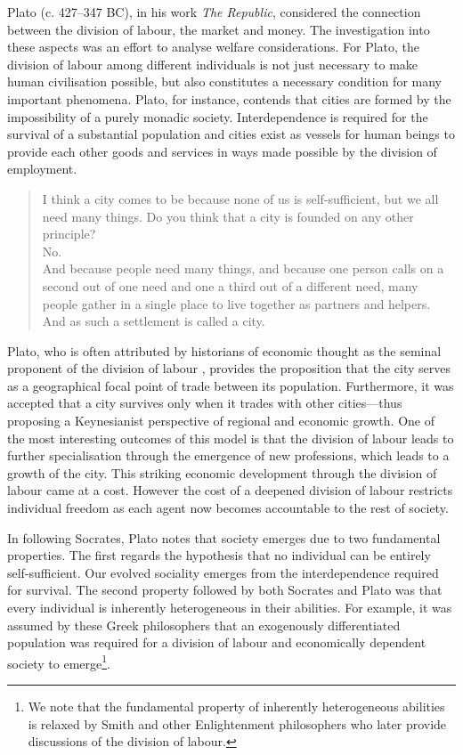 Plato (c. 427--347 BC), in his work \textit{The Republic}, considered the connection between the division of labour, the market and money. The investigation into these aspects was an effort to analyse welfare considerations. For Plato, the division of labour among different individuals is not just necessary to make human civilisation possible, but also constitutes a necessary condition for many important phenomena. Plato, for instance, contends that cities are formed by the impossibility of a purely monadic society. Interdependence is required for the survival of a substantial population and cities exist as vessels for human beings to provide each other goods and services in ways made possible by the division of employment.

\begin{quote}
I think a city comes to be because none of us is self-sufficient, but we all need many things. Do you think that a city is founded on any other principle?
\\
No.
\\
And because people need many things, and because one person calls on a second out of one need and one a third out of a different need, many people gather in a single place to live together as partners and helpers. And as such a settlement is called a city.

\begin{flushright}
\citet[p.~151]{Plato2007}
\end{flushright}
\end{quote}

Plato, who is often attributed by historians of economic thought as the seminal proponent of the division of labour \citep{Silvermintz2010}, provides the proposition that the city serves as a geographical focal point of trade between its population. Furthermore, it was accepted that a city survives only when it trades with other cities---thus proposing a Keynesianist perspective of regional and economic growth. One of the most interesting outcomes of this model is that the division of labour leads to further specialisation through the emergence of new professions, which leads to a growth of the city. This striking economic development through the division of labour came at a cost. However the cost of a deepened division of labour restricts individual freedom as each agent now becomes accountable to the rest of society.

In following Socrates, Plato notes that society emerges due to two fundamental properties. The first regards the hypothesis that no individual can be entirely self-sufficient. Our evolved sociality emerges from the interdependence required for survival. The second property followed by both Socrates and Plato was that every individual is inherently heterogeneous in their abilities. For example, it was assumed by these Greek philosophers that an exogenously differentiated population was required for a division of labour and economically dependent society to emerge\footnote{We note that the fundamental property of inherently heterogeneous abilities is relaxed by Smith and other Enlightenment philosophers who later provide discussions of the division of labour.}.

